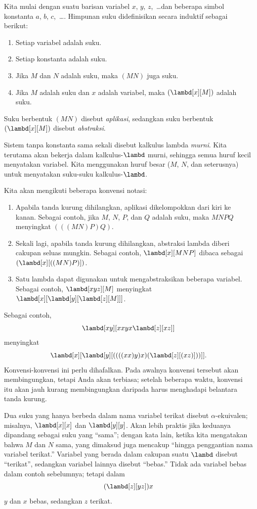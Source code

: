 \documentclass[../../../include/open-logic-section]{subfiles}
\begin{document}

Kita mulai dengan suatu barisan variabel $x$, $y$, $z$,~\dots dan beberapa
simbol konstanta $a$, $b$, $c$,~\dots. Himpunan suku didefinisikan secara
induktif sebagai berikut:
\begin{enumerate}
\item Setiap variabel adalah suku.
\item Setiap konstanta adalah suku.
\item Jika $M$ dan $N$ adalah suku, maka $(MN)$ juga suku.
\item Jika $M$ adalah suku dan $x$ adalah variabel, maka
  $(\lambd[x][M])$ adalah suku.
\end{enumerate}
Suku berbentuk $(MN)$ disebut \emph{aplikasi}, sedangkan suku berbentuk
$(\lambd[x][M])$ disebut \emph{abstraksi}.

Sistem tanpa konstanta sama sekali disebut kalkulus lambda \emph{murni}. Kita
terutama akan bekerja dalam kalkulus-$\lambd$ murni, sehingga semua huruf kecil
menyatakan variabel. Kita menggunakan huruf besar ($M$, $N$, dan seterusnya)
untuk menyatakan suku-suku kalkulus-$\lambd$.

Kita akan mengikuti beberapa konvensi notasi:

\begin{conv}
\begin{enumerate}
\item Apabila tanda kurung dihilangkan, aplikasi dikelompokkan dari kiri ke
  kanan. Sebagai contoh, jika $M$, $N$, $P$, dan $Q$ adalah suku, maka $MNPQ$
  menyingkat $(((MN)P)Q)$.
\item Sekali lagi, apabila tanda kurung dihilangkan, abstraksi lambda diberi
  cakupan seluas mungkin. Sebagai contoh, $\lambd[x][MNP]$ dibaca sebagai
  $(\lambd[x][((MN)P)])$.
\item Satu lambda dapat digunakan untuk mengabstraksikan beberapa variabel.
  Sebagai contoh, $\lambd[xyz][M]$ menyingkat
  $\lambd[x][\lambd[y][\lambd[z][M]]]$.
\end{enumerate}
\end{conv}

Sebagai contoh,
\[
\lambd[xy][xxyx \lambd[z][xz]]
\]
menyingkat
\[
\lambd[x][\lambd[y][((((xx)y)x)(\lambd[z][(xz)]))]].
\]
Konvensi-konvensi ini perlu dihafalkan. Pada awalnya konvensi tersebut akan
membingungkan, tetapi Anda akan terbiasa; setelah beberapa waktu, konvensi itu
akan jauh kurang membingungkan daripada harus menghadapi belantara tanda
kurung.

Dua suku yang hanya berbeda dalam nama variabel terikat disebut
$\alpha$-ekuivalen; misalnya, $\lambd[x][x]$ dan $\lambd[y][y]$. Akan lebih
praktis jika keduanya dipandang sebagai suku yang ``sama''; dengan kata lain,
ketika kita mengatakan bahwa $M$ dan $N$ sama, yang dimaksud juga mencakup
``hingga penggantian nama variabel terikat.'' Variabel yang berada dalam
cakupan suatu $\lambd$ disebut ``terikat'', sedangkan variabel lainnya disebut
``bebas.'' Tidak ada variabel bebas dalam contoh sebelumnya; tetapi dalam
\[
(\lambd[z][yz])x
\]
$y$ dan $x$ bebas, sedangkan $z$ terikat.
\end{document}
